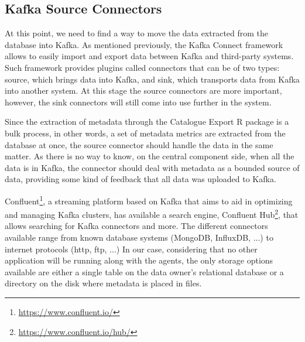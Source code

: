 \subsection{Kafka Source Connectors}

At this point, we need to find a way to move the data extracted from the database into Kafka.
As mentioned previously, the Kafka Connect framework allows to easily import and export data between Kafka and third-party systems.
Such framework provides plugins called connectors that can be of two types: source, which brings data into Kafka, and sink, which transports data from Kafka into another system.
At this stage the source connectors are more important, however, the sink connectors will still come into use further in the system.

Since the extraction of metadata through the Catalogue Export R package is a bulk process, in other words, a set of metadata metrics are extracted from the database at once, the source connector should handle the data in the same matter.
As there is no way to know, on the central component side, when all the data is in Kafka, the connector should deal with metadata as a bounded source of data, providing some kind of feedback that all data was uploaded to Kafka.

Confluent\footnote{\url{https://www.confluent.io/}}, a streaming platform based on Kafka that aims to aid in optimizing and managing Kafka clusters, has available a search engine, Confluent Hub\footnote{\url{https://www.confluent.io/hub/}}, that allows searching for Kafka connectors and more.
The different connectors available range from known database systems (MongoDB, InfluxDB, ...) to internet protocols (\gls{http}, \gls{ftp}, ...)
In our case, considering that no other application will be running along with the agents, the only storage options available are either a single table on the data owner's relational database or a directory on the disk where metadata is placed in files.

